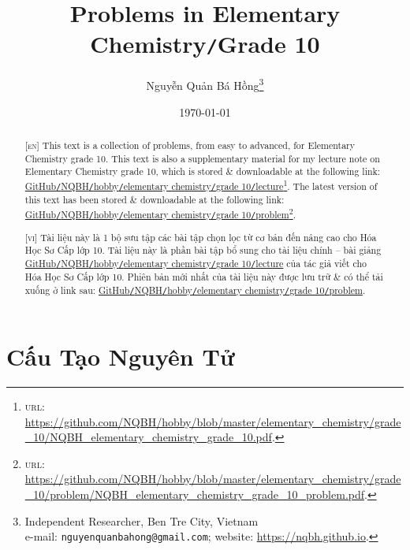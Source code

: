 \documentclass{article}
\title{Problems in Elementary Chemistry\texttt{/}Grade 10}
\author{Nguyễn Quản Bá Hồng\footnote{Independent Researcher, Ben Tre City, Vietnam\\e-mail: \texttt{nguyenquanbahong@gmail.com}; website: \url{https://nqbh.github.io}.}}
\date{\today}
\numberwithin{equation}{section}
\begin{document}
\maketitle
\begin{abstract}
	\textsc{[en]} This text is a collection of problems, from easy to advanced, for Elementary Chemistry grade 10. This text is also a supplementary material for my lecture note on Elementary Chemistry grade 10, which is stored \& downloadable at the following link: \href{https://github.com/NQBH/hobby/blob/master/elementary_chemistry/grade_10/NQBH_elementary_chemistry_grade_10.pdf}{GitHub\texttt{/}NQBH\texttt{/}hobby\texttt{/}elementary chemistry\texttt{/}grade 10\texttt{/}lecture}\footnote{\textsc{url}: \url{https://github.com/NQBH/hobby/blob/master/elementary_chemistry/grade_10/NQBH_elementary_chemistry_grade_10.pdf}.}. The latest version of this text has been stored \& downloadable at the following link: \href{https://github.com/NQBH/hobby/blob/master/elementary_chemistry/grade_10/problem/NQBH_elementary_chemistry_grade_10_problem.pdf}{GitHub\texttt{/}NQBH\texttt{/}hobby\texttt{/}elementary chemistry\texttt{/}grade 10\texttt{/}problem}\footnote{\textsc{url}: \url{https://github.com/NQBH/hobby/blob/master/elementary_chemistry/grade_10/problem/NQBH_elementary_chemistry_grade_10_problem.pdf}.}.
	\vspace{2mm}
	
	\textsc{[vi]} Tài liệu này là 1 bộ sưu tập các bài tập chọn lọc từ cơ bản đến nâng cao cho Hóa Học Sơ Cấp lớp 10. Tài liệu này là phần bài tập bổ sung cho tài liệu chính -- bài giảng \href{https://github.com/NQBH/hobby/blob/master/elementary_chemistry/grade_10/NQBH_elementary_chemistry_grade_10.pdf}{GitHub\texttt{/}NQBH\texttt{/}hobby\texttt{/}elementary chemistry\texttt{/}grade 10\texttt{/}lecture} của tác giả viết cho Hóa Học Sơ Cấp lớp 10. Phiên bản mới nhất của tài liệu này được lưu trữ \& có thể tải xuống ở link sau: \href{https://github.com/NQBH/hobby/blob/master/elementary_chemistry/grade_10/problem/NQBH_elementary_chemistry_grade_10_problem.pdf}{GitHub\texttt{/}NQBH\texttt{/}hobby\texttt{/}elementary chemistry\texttt{/}grade 10\texttt{/}problem}.
\end{abstract}
\tableofcontents
\newpage


\section{Cấu Tạo Nguyên Tử}
\end{document}
